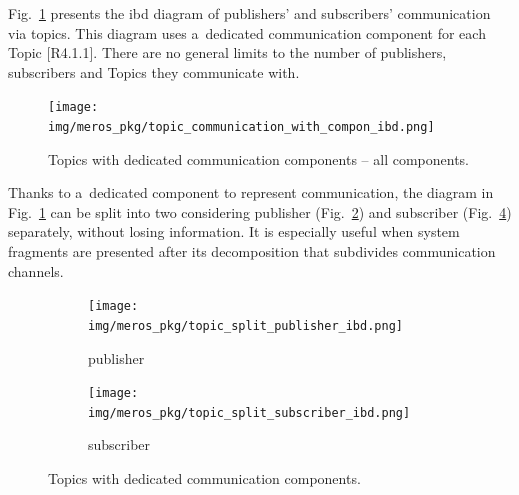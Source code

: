 \documentclass[11pt,oneside,a4paper]{report}
\begin{document}
	Fig.~\ref{fig:topic_communication_with_dedicated_component_ibd} presents the ibd diagram of publishers' and subscribers' communication via topics. This diagram uses a~dedicated communication component for each Topic [R4.1.1]. There are no general limits to the number of publishers, subscribers and Topics they communicate with. 
	

	\begin{figure}[H]
		\centering
		\begin{center}
			{\texttt{[image: img/meros\_pkg/topic\_communication\_with\_compon\_ibd.png]}}
		\end{center}
		\caption{Topics with dedicated communication components -- all components.} 
		\label{fig:topic_communication_with_dedicated_component_ibd}
	\end{figure}

	Thanks to a~dedicated component to represent communication, the diagram in Fig.~\ref{fig:topic_communication_with_dedicated_component_ibd} can be split into two considering publisher (Fig.~\ref{fig:topic_split_publisher_ibd}) and subscriber (Fig.~\ref{fig:topic_split_subscriber_ibd}) separately, without losing information. It is especially useful when system fragments are presented after its decomposition that subdivides communication channels.
	
	
	 \begin{figure}[H]
		\begin{subfigure}[b]{0.49\textwidth}
			\texttt{[image: img/meros\_pkg/topic\_split\_publisher\_ibd.png]}
			\caption{publisher}
			\label{fig:topic_split_publisher_ibd}
		\end{subfigure}
		\begin{subfigure}[b]{0.51\textwidth}
			\texttt{[image: img/meros\_pkg/topic\_split\_subscriber\_ibd.png]}
			\caption{subscriber}
			\label{fig:topic_split_subscriber_ibd}
		\end{subfigure}
		\caption{Topics with dedicated communication components.}
	\end{figure}
	

	
	
%
%
%
	
\end{document}
